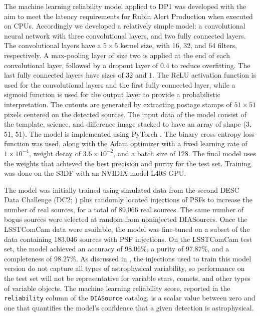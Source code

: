 The machine learning reliability model applied to \gls{DP1} was developed with the aim to meet the latency requirements for Rubin \gls{Alert Production} when executed on CPUs.
Accordingly we developed a relatively simple model: a convolutional neural network with three convolutional layers, and two fully connected layers.
The convolutional layers have a $5\xspace\times\xspace5$ kernel size, with 16, 32, and 64 filters, respectively.
A max-pooling layer of size two is applied at the end of each convolutional layer, followed by a dropout layer of 0.4 to reduce overfitting.
The last fully connected layers have sizes of 32 and 1.
The ReLU activation function is used for the convolutional layers and the first fully connected layer, while a sigmoid function is used for the output layer to provide a probabilistic interpretation.
The cutouts are generated by extracting postage stamps of $51\xspace\times\xspace51$ pixels centered on the detected sources.
The input data of the model consist of the template, science, and difference image stacked to have an array of \gls{shape} (3, 51, 51).
The model is implemented using PyTorch \citep[][]{10.1145/3620665.3640366}.
The binary cross entropy loss function was used, along with the \gls{Adam} optimizer with a fixed learning rate of $1\times10^{-4}$, weight decay of $3.6\times10^{-2}$, and a batch size of 128.
The final model uses the weights that achieved the best precision and purity for the test set.
Training was done on the \gls{S3DF} with an NVIDIA model L40S GPU.

The model was initially trained using simulated data from the second DESC Data Challenge (DC2; \citep[][]{2021ApJS..253...31L}) plus randomly located injections of PSFs to increase the number of real sources, for a total of 89,066 real sources.
The same number of bogus sources were selected at random from noninjected DIASources.
Once the  \gls{LSSTComCam} data were available, the model was fine-tuned on a subset of the data containing 183,046 sources with PSF injections.
On the \gls{LSSTComCam} test set, the model achieved an accuracy of 98.06\%, a purity of 97.87\%, and a completeness of 98.27\%.
As discussed in , the injections used to train this model version do not capture all types of astrophysical variability, so performance on the test set will not be representative for variable stars, comets, and other types of variable objects.
The machine learning reliability score, reported in the \texttt{reliability} column of the \texttt{DIASource} catalog, is a scalar value between zero and one that quantifies the model’s confidence that a given detection is astrophysical.

